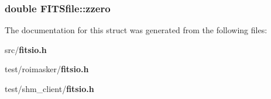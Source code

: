 \subsubsection{\setlength{\rightskip}{0pt plus 5cm}double \bf{FITSfile::zzero}}\label{structFITSfile_02930842674ceaf944372231964cd506}




The documentation for this struct was generated from the following files:\begin{CompactItemize}
\item 
src/\bf{fitsio.h}\item 
test/roimasker/\bf{fitsio.h}\item 
test/shm\_\-client/\bf{fitsio.h}\end{CompactItemize}
